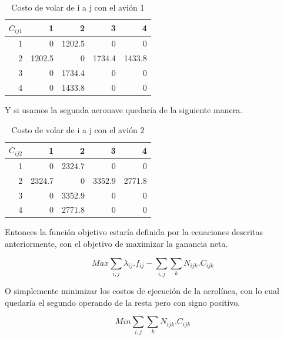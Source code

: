 \documentclass[12pt]{article}
\begin{document}
\begin{table}[h!]
    \centering
    \begin{tabular}{r|r|r|r|r}
        $C_{ij1}$%
               &   1  &   2  &   3  &   4\\
            \hline
            \hline
              1 &          0 &  1202.5  &          0  &          0\\
              2 & 1202.5 &           0  & 1734.4  & 1433.8\\
              3 &          0 &  1734.4  &          0  &          0\\
              4 &          0 &  1433.8  &          0  &          0\\
    \end{tabular}
    \caption{Costo de volar de i a j con el avión 1}
    \label{tab:cij1}
\end{table}

Y si usamos la segunda aeronave quedaría de la siguiente manera. 

\begin{table}[ht!]
    \centering
    \begin{tabular}{r|r|r|r|r}
        $C_{ij2}$%
               &   1  &   2  &   3  &   4\\
            \hline
            \hline
              1 &      0 &  2324.7 &       0 &       0\\
              2 & 2324.7 &       0 &  3352.9 &  2771.8\\
              3 &      0 &  3352.9 &       0 &       0\\
              4 &      0 &  2771.8 &       0 &       0\\
    \end{tabular}
    \caption{Costo de volar de i a j con el avión 2}
    \label{tab:cij2}
\end{table}

Entonces la función objetivo estaría definida por la ecuaciones descritas anteriormente, con el objetivo de maximizar la ganancia neta.

\begin{equation}
    Max \sum_{i,j} \lambda_{ij}.f_{ij} - \sum_{i,j}\sum_{k} N_{ijk}.C_{ijk}
\end{equation}

O simplemente minimizar los costos de ejecución de la aerolínea, con lo cual quedaría el segundo operando de la resta pero con signo positivo.

\begin{equation}
    Min \sum_{i,j}\sum_{k} N_{ijk}.C_{ijk}
\end{equation}
\end{document}
